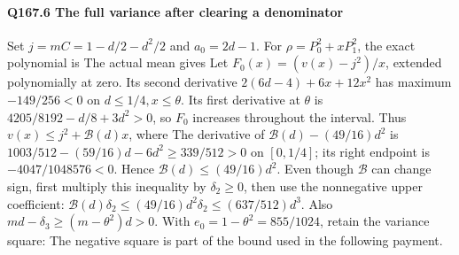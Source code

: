 \paragraph{Q167.6 The full variance after clearing a denominator}\label{part:Q167.6}
Set $j=\allowbreak mC=\allowbreak 1-d/2-d^2/2$ and $a_0=\allowbreak 2d-1$.
For $\rho=\allowbreak P_0^2+xP_1^2$, the exact polynomial is
The actual mean gives
Let $F_0(x)=\allowbreak (v(x)-j^2)/x$, extended polynomially at zero.
Its second derivative $2(6d-4)+6x+12x^2$ has maximum
$-149/256<\allowbreak 0$ on $d\le\allowbreak 1/4,\allowbreak x\le\allowbreak \theta$.
Its first derivative at $\theta$ is $4205/8192-d/8+3d^2>\allowbreak 0$,
so $F_0$ increases throughout the interval.
Thus $v(x)\le\allowbreak  j^2+\mathcal B(d)x$, where
The derivative of $\mathcal B(d)-(49/16)d^2$ is
$1003/512-(59/16)d-6d^2\ge\allowbreak 339/512>\allowbreak 0$ on $[0,\allowbreak 1/4]$;
its right endpoint is $-4047/1048576<\allowbreak 0$.
Hence $\mathcal B(d)\le\allowbreak (49/16)d^2$.
Even though $\mathcal B$ can change sign, first multiply this inequality
by $\delta_2\ge\allowbreak 0$, then use the nonnegative upper coefficient:
$\mathcal B(d)\delta_2\le\allowbreak (49/16)d^2\delta_2\le\allowbreak (637/512)d^3$.
Also $md-\delta_3\ge\allowbreak (m-\theta^2)d>\allowbreak 0$.
With $e_0=\allowbreak 1-\theta^2=\allowbreak 855/1024$, retain the variance square:
The negative square is part of the bound used in the following payment.

